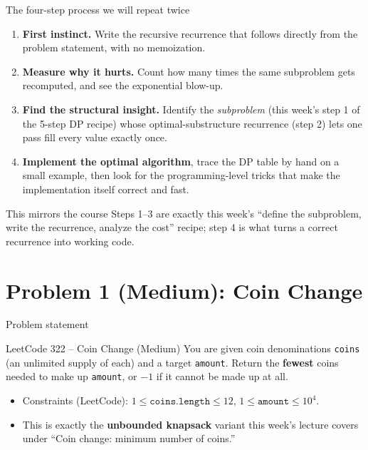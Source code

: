 \documentclass[11pt,aspectratio=169]{beamer}
\begin{document}
\begin{frame}{The four-step process we will repeat twice}
  \begin{enumerate}
    \item \textbf{First instinct.} Write the recursive recurrence that follows directly
    from the problem statement, with no memoization.
    \item \textbf{Measure why it hurts.} Count how many times the same subproblem gets
    recomputed, and see the exponential blow-up.
    \item \textbf{Find the structural insight.} Identify the \emph{subproblem} (this
    week's step 1 of the 5-step DP recipe) whose optimal-substructure recurrence
    (step 2) lets one pass fill every value exactly once.
    \item \textbf{Implement the optimal algorithm}, trace the DP table by hand on a
    small example, then look for the programming-level tricks that make the
    implementation itself correct and fast.
  \end{enumerate}
  \begin{alertblock}{This mirrors the course}
    Steps 1--3 are exactly this week's ``define the subproblem, write the recurrence,
    analyze the cost'' recipe; step 4 is what turns a correct recurrence into working
    code.
  \end{alertblock}
\end{frame}

\section{Problem 1 (Medium): Coin Change}

\begin{frame}{Problem statement}
  \begin{block}{LeetCode 322 -- Coin Change (\textcolor{blue!50!black}{Medium})}
    You are given coin denominations \texttt{coins} (an unlimited supply of each) and a
    target \texttt{amount}. Return the \textbf{fewest} coins needed to make up
    \texttt{amount}, or $-1$ if it cannot be made up at all.
  \end{block}
  \begin{itemize}
    \item Constraints (LeetCode): $1 \le \texttt{coins.length} \le 12$,
    $1 \le \texttt{amount} \le 10^4$.
    \item This is exactly the \textbf{unbounded knapsack} variant this week's lecture
    covers under ``Coin change: minimum number of coins.''
  \end{itemize}
\end{frame}
\end{document}
